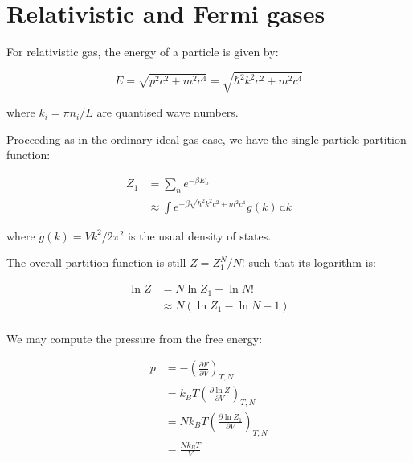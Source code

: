 \documentclass[12pt]{article}
\begin{document}



\pagebreak
\section*{Relativistic and Fermi gases}



For relativistic gas, the energy of a particle is given by:

\begin{equation}
    E = \sqrt{p^{2} c^{2} + m^{2} c^{4}} = \sqrt{\hbar^{2} k^{2} c^{2} + m^{2} c^{4}}
\end{equation}

where $k_{i} = \pi n_{i} / L$ are quantised wave numbers.

Proceeding as in the ordinary ideal gas case, we have the single particle partition function:

\begin{equation}
    \begin{split}
        Z_{1} &= \sum_{n} e^{-\beta E_{n}} \\
        &\approx \int e^{-\beta \sqrt{\hbar^{2} k^{2} c^{2} + m^{2} c^{4}}} g(k) \, \mathrm{d}k
    \end{split}
\end{equation}

where $g(k) = Vk^{2}/2\pi^{2}$ is the usual density of states.

The overall partition function is still $Z = Z_{1}^{N}/N!$ such that its logarithm is:

\begin{equation}
    \begin{split}
        \ln{Z} &= N \ln{Z_{1}} - \ln{N!} \\
        &\approx N \left( \ln{Z_{1}} - \ln{N} - 1 \right) \\
    \end{split}
\end{equation}

We may compute the pressure from the free energy:

\begin{equation}
    \begin{split}
        p &= -\left( \frac{\partial F}{\partial V} \right)_{T, N} \\
        &= k_{B} T \left( \frac{\partial \ln{Z}}{\partial V} \right)_{T, N} \\
        &= N k_{B} T \left( \frac{\partial \ln{Z_{1}}}{\partial V} \right)_{T, N} \\
        &= \frac{N k_{B} T}{V}
    \end{split}
\end{equation}
\end{document}
